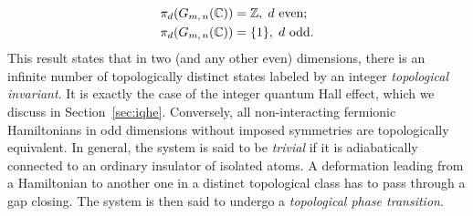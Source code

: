\begin{equation}
\begin{aligned}
\pi_d (G_{m, \, n} ( \mathbb{C})) &= \mathbb{Z}, \hspace*{0.1cm} d \textnormal{ even}; \\
\pi_d (G_{m, \, n} ( \mathbb{C})) & = \lbrace 1 \rbrace, \hspace*{0.1cm} d \textnormal{ odd}.
\end{aligned}
\end{equation}
This result states that in two (and any other even) dimensions, there is an infinite number of topologically distinct states labeled by an integer \emph{topological invariant}. It is exactly the case of the integer quantum Hall effect, which we discuss in Section~\ref{sec:iqhe}. Conversely, all non-interacting fermionic Hamiltonians in odd dimensions without imposed symmetries are topologically equivalent. In general, the system is said to be \emph{trivial} if it is adiabatically connected to an ordinary insulator of isolated atoms. A deformation leading from a Hamiltonian to another one in a distinct topological class has to pass through a gap closing. The system is then said to undergo a \emph{topological phase transition}.


